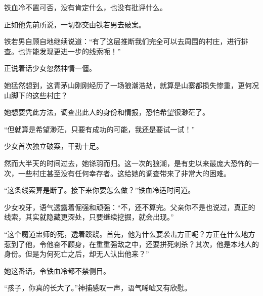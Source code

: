 \begin{this_body}
铁血冷不置可否，没有肯定什么，也没有批评什么。

正如他先前所说，一切都交由铁若男去破案。

铁若男自顾自地继续说道：“有了这层推断我们完全可以去周围的村庄，进行排查。也许能发现更进一步的线索呃！”

正说着话少女忽然神情一僵。

她猛然想到，这青茅山刚刚经历了一场狼潮浩劫，就算是山寨都损失惨重，更何况山脚下的这些村庄？

她想要凭此方法，调查出此人的身份和情报，恐怕希望很渺茫了。

“但就算是希望渺茫，只要有成功的可能，我还是要试一试！”

少女首次独立破案，干劲十足。

然而大半天的时间过去，她铩羽而归。这一次的狼潮，是有史以来最庞大恐怖的一次，一些村庄甚至没有任何幸存者。这给她的调查带来了非常大的困难。

“这条线索算是断了。接下来你要怎么做？”铁血冷适时问道。

少女咬牙，语气透露着倔强和顽强：“不，还不算完。父亲你不是也说过，真正的线索，其实就隐藏更深处，只要继续挖掘，就会出现。”

“这个魔道盅师的死，透着蹊跷。首先，他为什么要袭击方正呢？方正在什么地方惹到了他，令他奋不顾身，在重重强敌之中，还要拼死刺杀？其次，他是本地人的身份。但是为何死亡之后，却无人认出他来？”

她这番话，令铁血冷都不禁侧目。

“孩子，你真的长大了。”神捕感叹一声，语气唏嘘又有欣慰。

\end{this_body}

